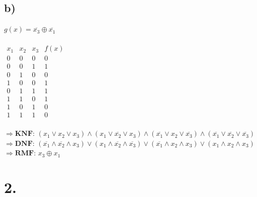 \documentclass[a4paper]{scrartcl}
\begin{document}
	\subsection{b)}
		\(g(x)=\overline{x_3}\oplus\overline{x_1}\) \\ \\
		\(
		\begin{array}{c|c|c||c}
			x_1&x_2&x_3&f(x) \\ \hline
			0&0&0&0 \\
			0&0&1&1 \\
			0&1&0&0 \\
			1&0&0&1 \\
			0&1&1&1 \\
			1&1&0&1 \\
			1&0&1&0 \\
			1&1&1&0
		\end{array}
		\) \\ \\
		\(\Rightarrow \textbf{KNF: } 
		(x_1\vee x_2\vee x_3)\land
		(x_1\vee \overline{x_2}\vee x_3)\land
		(\overline{x_1}\vee x_2 \vee \overline{x_3})\land
		(\overline{x_1}\vee \overline{x_2}\vee\overline{x_3})\) \\
		\(\Rightarrow \textbf{DNF: } 
		(\overline{x_1}\land\overline{x_2}\land x_3)\vee
		(x_1\land \overline{x_2}\land\overline{x_3})\vee
		(\overline{x_1}\land x_2\land x_3)\vee
		(x_1\land x_2\land x_3)\) \\
		\(\Rightarrow\textbf{RMF: } x_3 \oplus x_1 \) \\

\section{2.}
\end{document}
